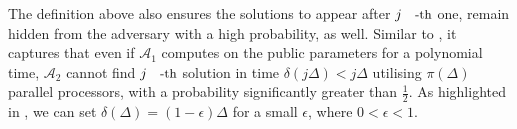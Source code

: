 

The  definition above also ensures  the  solutions to appear after $j\text{\small{-th}}$ one,  remain hidden from the adversary with a high probability, as well. Similar to \cite{BonehBBF18,MalavoltaT19,garay2019}, it captures that even if     $\mathcal{A}_{\scriptscriptstyle 1}$ computes on the public parameters for a polynomial time,  $\mathcal{A}_{\scriptscriptstyle 2}$  cannot find $j\text{\small{-th}}$  solution in time $\delta(j\Delta)<j\Delta$ utilising $\pi(\Delta)$ parallel processors, with a probability significantly greater than $\frac{1}{2}$. As highlighted in  \cite{BonehBBF18}, we can set $\delta(\Delta)=(1-\epsilon)\Delta$ for a small  $\epsilon$, where $0<\epsilon<1$.

